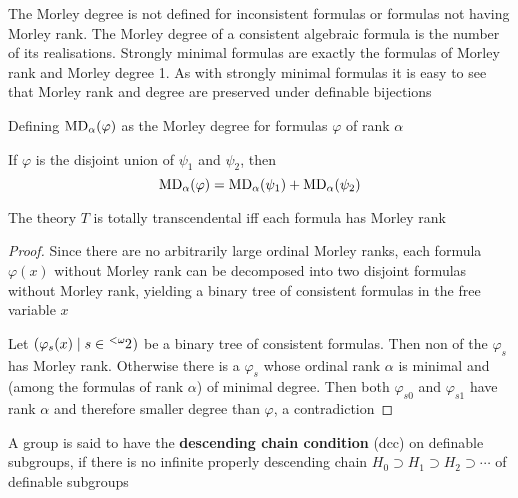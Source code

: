 \documentclass[11pt]{article}
\begin{document}
The Morley degree is not defined for inconsistent formulas or formulas not having Morley rank.
The Morley degree of a consistent algebraic formula is the number of its realisations. Strongly
minimal formulas are exactly the formulas of Morley rank and Morley degree 1. As with strongly
minimal formulas it is easy to see that Morley rank and degree are preserved under definable
bijections

Defining \(\operatorname{MD}_\alpha(\varphi)\) as the Morley degree for formulas \(\varphi\) of rank \(\alpha\)

\begin{lemma}[]
If \(\varphi\) is the disjoint union of \(\psi_1\) and \(\psi_2\), then
\begin{equation*}
\operatorname{MD}_\alpha(\varphi)=\operatorname{MD}_\alpha(\psi_1)+\operatorname{MD}_\alpha(\psi_2)
\end{equation*}
\end{lemma}

\begin{theorem}[]
The theory \(T\) is totally transcendental iff each formula has Morley rank
\end{theorem}

\begin{proof}
Since there are no arbitrarily large ordinal Morley ranks, each formula \(\varphi(x)\) without Morley
rank can be decomposed into two disjoint formulas without Morley rank, yielding a binary tree of
consistent formulas in the free variable \(x\)

Let \((\varphi_s(x)\mid s\in\tensor[^{<\omega}]{2}{})\) be a binary tree of consistent formulas. Then non of
the \(\varphi_s\) has Morley rank. Otherwise there is a \(\varphi_s\) whose ordinal rank \(\alpha\) is minimal and
(among the formulas of rank \(\alpha\)) of minimal degree. Then both \(\varphi_{s0}\) and \(\varphi_{s1}\) have rank
\(\alpha\) and therefore smaller degree than \(\varphi\), a contradiction
\end{proof}

A group is said to have the \textbf{descending chain condition} (dcc) on definable subgroups, if there is
no infinite properly descending chain \(H_0\supset H_1\supset H_2\supset\cdots\) of definable subgroups
\end{document}
